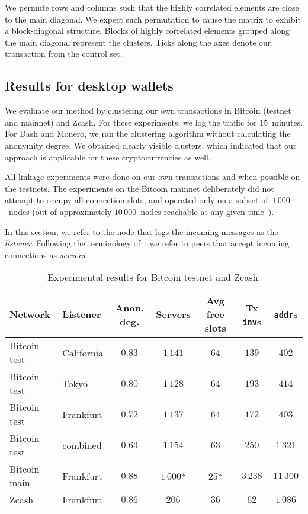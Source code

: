 We permute rows and columns such that the highly correlated elements are close to the main diagonal.
We expect such permutation to cause the matrix to exhibit a block-diagonal structure.
Blocks of highly correlated elements grouped along the main diagonal represent the clusters.
Ticks along the axes denote our transaction from the control set.


\subsection{Results for desktop wallets}

We evaluate our method by clustering our own transactions in Bitcoin (testnet and mainnet) and Zcash.
For these experiments, we log the traffic for $15$~minutes.
For Dash and Monero, we ran the clustering algorithm without calculating the anonymity degree.
We obtained clearly visible clusters, which indicated that our approach is applicable for these cryptocurrencies as well.

All linkage experiments were done on our own transactions and when possible on the testnets.
The experiments on the Bitcoin mainnet deliberately did not attempt to occupy all connection slots, and operated only on a subset of~$1\,000$~nodes (out of approximately $10\,000$~nodes reachable at any given time~\cite{Bitnodes}).

In this section, we refer to the node that logs the incoming messages as the \textit{listener}.
Following the terminology of~\cite{Biryukov2014}, we refer to peers that accept incoming connections as \textit{servers}.

\begin{table*}[!t]
	\normalsize
	\caption{Experimental results for Bitcoin testnet and Zcash.}
	\centering
	\begin{tabular}{|l|l|c|c|c|c|c|}
		\hline
		Network & Listener & Anon\@. deg. & Servers & Avg free slots & Tx \texttt{inv}s & \texttt{addr}s \\
		\hline
		Bitcoin test & California & $0.83$ & $1\,141$ & $64$ & $139$ & $402$ \\
		Bitcoin test & Tokyo & $0.80$ & $1\,128$ & $64$ & $193$ & $414$ \\
		Bitcoin test & Frankfurt & $0.72$ & $1\,137$ & $64$ & $172$ & $403$ \\
		Bitcoin test & combined & $0.63$ & $1\,154$ & $63$ & $250$ & $1\,321$ \\
		Bitcoin main & Frankfurt & $0.88$ & $1\,000$* & $25$* & $3\,238$ & $11\,300$ \\
		Zcash & Frankfurt & $0.86$ & $206$ & $36$ & $62$ & $1\,086$ \\
		\hline
	\end{tabular}
	\label{tab:results}
\end{table*}

